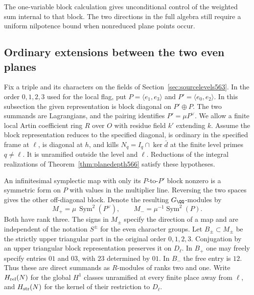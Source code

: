 \documentclass[a4paper,11pt]{article}
\theoremstyle{definition}
\theoremstyle{remark}
\numberwithin{equation}{section}
\begin{document}
The one-variable block calculation gives unconditional control
of the weighted sum internal to that block. The two directions
in the full algebra still require a uniform nilpotence bound
when nonreduced plane points occur.


\subsection{Ordinary extensions between the two even planes}
\label{sec:ordinarycross568}

Fix a triple and its characters on the fields of
Section~\ref{sec:sourcelevels563}. In the order \(0,1,2,3\) used
for the local flag, put \(P=\langle e_1,e_3\rangle\) and
\(P'=\langle e_0,e_2\rangle\). In this subsection the given
representation is block diagonal on \(P'\oplus P\). The two
summands are Lagrangians, and the pairing identifies
\(P'=\mu P^\vee\). We allow a finite local Artin coefficient ring
\(R\) over \(O\) with residue field \(k'\) extending \(k\).
Assume the block representation reduces to the specified diagonal,
is ordinary in the specified frame at \(\ell\), is diagonal at
\(h\), and kills \(N_q=I_q\cap\ker\bar d\) at the finite
level primes \(q\ne\ell\). It is unramified outside the level
and \(\ell\). Reductions of the integral realizations of
Theorem~\ref{thm:planedepth566} satisfy these hypotheses.

An infinitesimal symplectic map with only its \(P\)-to-\(P'\)
block nonzero is a symmetric form on \(P\) with values in the
multiplier line. Reversing the two spaces gives the other
off-diagonal block. Denote the resulting \(G_\QQ\)-modules by
\[
      M_+=\mu\,\operatorname{Sym}^2(P^\vee),\qquad
      M_-=\mu^{-1}\operatorname{Sym}^2(P).
\]
Both have rank three. The signs in \(M_\pm\) specify the
direction of a map and are independent of the notation \(S^\pm\)
for the even character groups. Let \(B_\pm\subset M_\pm\) be
the strictly upper triangular part in the original order
\(0,1,2,3\). Conjugation by an upper triangular block
representation preserves it on \(D_\ell\). In \(B_+\) one
may freely specify entries \(01\) and \(03\), with \(23\)
determined by \(01\). In \(B_-\) the free entry is \(12\).
Thus these are direct summands as \(R\)-modules of ranks two
and one. Write \(H_{\rm rel}(N)\) for the global \(H^1\)
classes unramified at every finite place away from \(\ell\),
and \(H_{\rm str}(N)\) for the kernel of their restriction to
\(D_\ell\).
\end{document}
